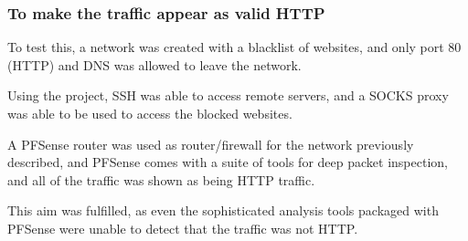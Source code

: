 \subsubsection*{To make the traffic appear as valid HTTP}
To test this, a network was created with a blacklist of websites, and only port 80 (HTTP) and DNS was allowed to leave the network.\par
Using the project, SSH was able to access remote servers, and a SOCKS proxy was able to be used to access the blocked websites.\par
A PFSense router was used as router/firewall for the network previously described, and PFSense comes with a suite of tools for deep packet inspection, and all of the traffic was shown as being HTTP traffic.\par
This aim was fulfilled, as even the sophisticated analysis tools packaged with PFSense were unable to detect that the traffic was not HTTP\@.
